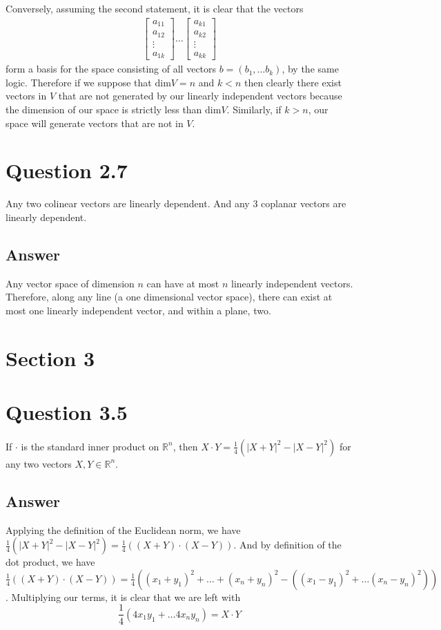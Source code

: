 \documentclass[
	12pt, %
]{fphw}
\begin{document}
Conversely, assuming the second statement, it is clear that the vectors
\begin{align*}
     \begin{bmatrix}
           a_{11} \\
           a_{12} \\
           \vdots \\
           a_{1k}
         \end{bmatrix} \dots
     \begin{bmatrix}
	     a_{k1} \\
	     a_{k2} \\
	     \vdots \\
	     a_{kk}
     \end{bmatrix}
  \end{align*}
  form a basis for the space consisting of all vectors $b=(b_1, \dots b_k)$,
  by the same logic. Therefore if we suppose that $\text{dim}V=n$ and $k<n$
  then clearly there exist vectors in $V$ that are not generated by our linearly independent vectors because the dimension of our space is strictly less than $\text{dim}V$. Similarly, if $k>n$, our space will generate vectors that are not in $V$.
\section*{Question 2.7}
\begin{problem}
	Any two colinear vectors are linearly dependent. And any 3 coplanar vectors are 
	linearly dependent. 
\end{problem}
\subsection*{Answer}
	Any vector space of dimension $n$ can have at most $n$ linearly independent vectors. Therefore, along any line (a one dimensional vector space), there can exist at most one linearly independent vector, and within a plane, two. 
\section*{Section 3}
\section*{Question 3.5}
\begin{problem}
	If $\cdot$ is the standard inner product on $\mathbb{R}^n$, then 
	$X \cdot Y = \frac{1}{4}(|X+Y|^2-|X-Y|^2)$
for any two vectors $X, Y \in \mathbb{R}^n$.
\end{problem}
\subsection*{Answer}
Applying the definition of the Euclidean norm, we have \\
$\frac{1}{4}(|X+Y|^2-|X-Y|^2) = \frac{1}{4}((X+Y) \cdot (X-Y))$. And by definition of the dot product, we have \\
$\frac{1}{4}((X+Y) \cdot (X-Y)) = \frac{1}{4}((x_1+y_1)^2 + \dots + (x_n+y_n)^2 -((x_1-y_1)^2 + \dots (x_n-y_n)^2))$. 
Multiplying our terms, it is clear that we are left with \\
$$\frac{1}{4}(4x_1y_1 + \dots 4x_ny_n )=X \cdot Y$$
\end{document}
